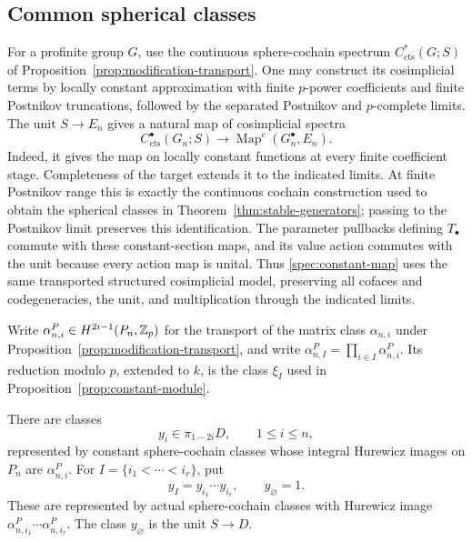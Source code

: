\subsection{Common spherical classes}

For a profinite group \(G\), use the continuous sphere-cochain spectrum
\(C^*_{\mathrm{cts}}(G;S)\) of
Proposition~\ref{prop:modification-transport}. One may construct its
cosimplicial terms by locally constant approximation with finite
\(p\)-power coefficients and finite Postnikov truncations, followed
by the separated Postnikov and \(p\)-complete limits. The unit
\(S\to E_n\) gives a natural map of cosimplicial spectra
\begin{equation}
C^\bullet_{\mathrm{cts}}(G_n;S)
\longrightarrow\operatorname{Map}^c(G_n^\bullet,E_n).
\label{spec:constant-map}
\end{equation}
Indeed, it gives the map on locally constant functions at every
finite coefficient stage. Completeness of the target extends it to
the indicated limits. At finite Postnikov range this is exactly the
continuous cochain construction used to obtain the spherical classes
in Theorem~\ref{thm:stable-generators}; passing to the Postnikov limit
preserves this identification. The parameter pullbacks defining
\(T_\bullet\) commute with these constant-section maps, and its value
action commutes with the unit because every action map is unital.
Thus \eqref{spec:constant-map} uses the same transported structured
cosimplicial model, preserving all cofaces and codegeneracies, the unit,
and multiplication through the indicated limits.

Write $\alpha^P_{n,i}\in H^{2i-1}(P_n,\mathbb Z_p)$ for the transport
of the matrix class $\alpha_{n,i}$ under
Proposition~\ref{prop:modification-transport}, and write
$\alpha^P_{n,I}=\prod_{i\in I}\alpha^P_{n,i}$.
Its reduction modulo $p$, extended to $k$, is the class $\xi_I$
used in Proposition~\ref{prop:constant-module}.

\begin{proposition}
\label{spec:global-classes}
There are classes
\[
y_i\in\pi_{1-2i}D,\qquad 1\leq i\leq n,
\]
represented by constant sphere-cochain classes whose integral
Hurewicz images on \(P_n\) are \(\alpha^P_{n,i}\). For
\(I=\{i_1<\cdots<i_r\}\), put
\[
y_I=y_{i_1}\cdots y_{i_r},\qquad y_\varnothing=1.
\]
These are represented by actual sphere-cochain classes with
Hurewicz image \(\alpha^P_{n,i_1}\cdots\alpha^P_{n,i_r}\). The class
\(y_\varnothing\) is the unit \(S\to D\).
\end{proposition}

